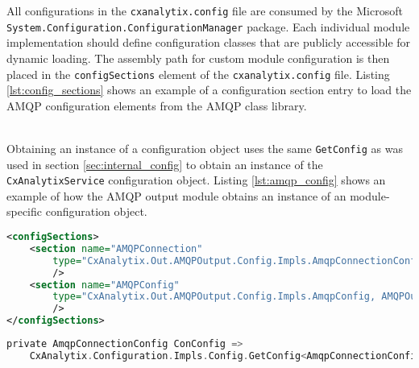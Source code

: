 All configurations in the \texttt{cxanalytix.config} file are consumed by the Microsoft\\ 
\texttt{System.Configuration.ConfigurationManager} package.
Each individual module implementation should define configuration classes that are publicly accessible for dynamic loading.
The assembly path for custom module configuration is then placed in the \texttt{configSections} element of the \texttt{cxanalytix.config}
file.  Listing \ref{lst:config_sections} shows an example of a configuration section entry to load the AMQP configuration elements
from the AMQP class library.

\noindent\\Obtaining an instance of a configuration object uses the same \texttt{GetConfig} as was used in section \ref{sec:internal_config}
to obtain an instance of the \texttt{CxAnalytixService} configuration object.  Listing \ref{lst:amqp_config} shows an example of
how the AMQP output module obtains an instance of an module-specific configuration object.

\begin{lstlisting}[caption={AMQP Configuration Section Entries}, label={lst:config_sections}, language=XML]
<configSections>
    <section name="AMQPConnection" 
        type="CxAnalytix.Out.AMQPOutput.Config.Impls.AmqpConnectionConfig, AMQPOutput"
        />
    <section name="AMQPConfig" 
        type="CxAnalytix.Out.AMQPOutput.Config.Impls.AmqpConfig, AMQPOutput"
        />
</configSections>
\end{lstlisting}


\begin{lstlisting}[caption={Retrieving a Config Object Instance}, label={lst:amqp_config}, language=C]
private AmqpConnectionConfig ConConfig =>
    CxAnalytix.Configuration.Impls.Config.GetConfig<AmqpConnectionConfig>();
\end{lstlisting}
    